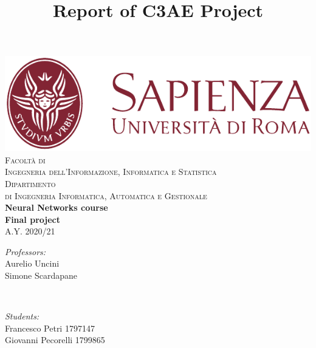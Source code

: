 \documentclass[a4paper]{report}
\begin{document}
\title{Report of C3AE Project}

\makeatletter
\let\thetitle\@title
\let\theauthor\@author
\let\thedate\@date
\makeatother

\begin{titlepage}
	\centering
    \vspace*{0.5 cm}
    \includegraphics{images/sapienza-MLred-pos}\\[1.0 cm]	%
    \vspace*{-0.3cm}
    \textsc{\large Facoltà di \\Ingegneria dell'Informazione, Informatica e Statistica}\\[0.5 cm]	%
    \textsc{\large Dipartimento \\di Ingegneria Informatica, Automatica e Gestionale}\\[0.5 cm]	%
    \textbf{\large Neural Networks course}\\[0.1 cm]
    \textbf{\large Final project}\\[2.0 cm]
    \textsc{\large A.Y. 2020/21}\\[2.0 cm]
    { \fontsize{20.74pt}{18.5pt}\selectfont\bfseries \thetitle \par } %
    \vspace*{5.6cm}
	\begin{minipage}{0.4\textwidth}
		\begin{flushleft} \large
			\emph{Professors:}\\
			Aurelio Uncini\\
            Simone Scardapane
		\end{flushleft}
	\end{minipage}~
	\begin{minipage}{0.4\textwidth}
		\begin{flushright} \large
			\emph{Students:} \\
            Francesco Petri 1797147\\
            Giovanni Pecorelli 1799865
		\end{flushright}
	\end{minipage}\\[2 cm]
\end{titlepage}
\end{document}

